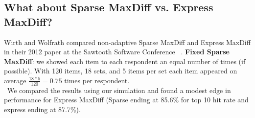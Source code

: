 \documentclass[nonblindrev]{informs3}
\begin{document}
\subsection{What about Sparse MaxDiff vs. Express MaxDiff?}
Wirth and Wolfrath compared non-adaptive Sparse MaxDiff and Express MaxDiff in their 2012 paper at the Sawtooth Software Conference ~\cite{wirth2012largeset}. 
\textbf{Fixed Sparse MaxDiff}: we showed each item to each respondent an equal number of times (if possible).  With 120 items, 18 sets, and 5 items per set each item appeared on average $\frac{18*5}{120} = 0.75$ times per respondent. \\
 We compared the results using our simulation and found a modest edge in performance for Express MaxDiff (Sparse ending at 85.6\% for top 10 hit rate and express ending at 87.7\%).
\end{document}
